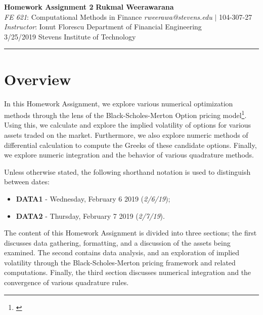 \documentclass[10pt]{article}
\begin{document}
\thispagestyle{plain}



\noindent
\large\textbf{Homework Assignment 2} \hfill \textbf{Rukmal Weerawarana} \\
\normalsize \textit{FE 621}: Computational Methods in Finance \hfill \textit{rweerawa@stevens.edu} $\mid$ 104-307-27 \\
\textit{Instructor}: Ionut Florescu \hfill Department of Financial Engineering \\
3/25/2019 \hfill Stevens Institute of Technology

\noindent\rule{\linewidth}{.1em}



\section*{Overview}

In this Homework Assignment, we explore various numerical optimization methods through the lens of the Black-Scholes-Merton Option pricing model\footnote{\cite{Shreve2004}}. Using this, we calculate and explore the implied volatility of options for various assets traded on the market. Furthermore, we also explore numeric methods of differential calculation to compute the Greeks of these candidate options. Finally, we explore numeric integration and the behavior of various quadrature methods.

Unless otherwise stated, the following shorthand notation is used to distinguish between dates:

\begin{itemize}
    \item \textbf{DATA1} - Wednesday, February 6 2019 (\textit{2/6/19});
    \item \textbf{DATA2} - Thursday, February 7 2019 (\textit{2/7/19}).
\end{itemize}

The content of this Homework Assignment is divided into three sections; the first discusses data gathering, formatting, and a discussion of the assets being examined. The second contains data analysis, and an exploration of implied volatility through the Black-Scholes-Merton pricing framework and related computations. Finally, the third section discusses numerical integration and the convergence of various quadrature rules.
\end{document}
